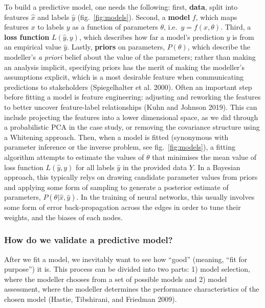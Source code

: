 \documentclass[10pt,oneside]{article}
\begin{document}
To build a predictive model, one needs the following: first,
\textbf{data}, split into features \(\hat{x}\) and labels \(\hat{y}\)
(fig.~\ref{fig:models}). Second, a \textbf{model} \(f\), which maps
features \(x\) to labels \(y\) as a function of parameters \(\theta\),
i.e.~\(y = f(x, \theta)\). Third, a \textbf{loss function}
\(L(\hat{y}, y)\), which describes how far a model's prediction \(y\) is
from an empirical value \(\hat{y}\). Lastly, \textbf{priors} on
parameters, \(P(\theta)\), which describe the modeller's \emph{a priori}
belief about the value of the parameters; rather than making an analysis
implicit, specifying priors has the merit of making the modeller's
assumptions explicit, which is a most desirable feature when
communicating predictions to stakeholders (Spiegelhalter et al. 2000).
Often an important step before fitting a model is feature engineering:
adjusting and reworking the features to better uncover feature-label
relationships (Kuhn and Johnson 2019). This can include projecting the
features into a lower dimensional space, as we did through a
probabilistic PCA in the case study, or removing the covariance
structure using a Whitening approach. Then, when a model is fitted
(synonymous with parameter inference or the inverse problem, see
fig.~\ref{fig:models}), a fitting algorithm attempts to estimate the
values of \(\theta\) that minimises the mean value of loss function
\(L(\hat{y},y)\) for all labels \(\hat{y}\) in the provided data \(Y\).
In a Bayesian approach, this typically relys on drawing candidate
parameter values from priors and applying some form of sampling to
generate a posterior estimate of parameters,
\(P(\theta | \hat{x}, \hat{y})\). In the training of neural networks,
this usually involves some form of error back-propagation across the
edges in order to tune their weights, and the biases of each nodes.

\hypertarget{how-do-we-validate-a-predictive-model}{%
\subsubsection{How do we validate a predictive
model?}\label{how-do-we-validate-a-predictive-model}}

After we fit a model, we inevitably want to see how ``good'' (meaning,
``fit for purpose'') it is. This process can be divided into two parts:
1) model selection, where the modeller chooses from a set of possible
models and 2) model assessment, where the modeller determines the
performance characteristics of the chosen model (Hastie, Tibshirani, and
Friedman 2009).
\end{document}
